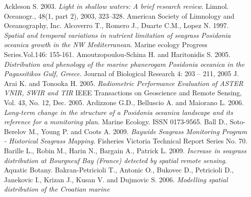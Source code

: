 \documentclass[11pt]{article}
\begin{document}
\begin{thebibliography}{999}
\label{bib}


Ackleson S.\index[people]{} 2003. \emph{Light in shallow waters: A brief research review}. Limnol. Oceanogr.,
48(1, part 2), 2003, 323–328. American Society of Limnology and Oceanography, Inc. \pageref{Ackleson, 2003}
Alcoverro T., Romero J., Duarte C.M., Lopez N. 1997. \emph{Spatial and temporal variations
in nutrient limitation of seagrass \textit{Posidonia oceanica} growth in the NW Mediterranean}.
Marine ecology Progress Series.Vol.146: 155-161. \pageref{Alcoverro1997}
Amoutzopoulou-Schina H. and Haritonidis S. 2005. \emph{Distribution and phenology of the marine phanerogam \textit{Posidonia oceanica} in the Pagassitikos Gulf, Greece}. Journal of
Biological Research 4: 203 – 211, 2005 J. \pageref{Amoutzopoulou-Schina05}
Arai K. and Tonooka H. 2005. \emph{Radiometric Performance Evaluation of \ac{ASTER} VNIR, \ac{SWIR} and \ac{TIR}} 
IEEE Transactions on Geoscience and Remote Sensing, Vol. 43, No. 12, Dec. 2005. \pageref{Arai05}
Ardizzone G.D., Belluscio A. and Maiorano L. 2006. \emph{Long-term change in the structure of
a \textit{Posidonia oceanica} landscape and its reference for a monitoring plan}. Marine Ecology.
ISSN 0173-9565. \pageref{Ardizzone06}
Ball D., Soto-Berelov M., Young P. and Coots A. 2009. \emph{Baywide Seagrass Monitoring Program - Historical Seagrass Mapping}. Fisheries Victoria Technical Report Series No. 70. \pageref{Ball09}
Barille L., Robin M., Harin N., Bargain A., Patrick L. 2009. \emph{Increase in seagrass distribution at Bourgneuf Bay (France) detected by spatial remote sensing}. Aquatic Botany. \pageref{Barille09}
Bakran-Petricioli T., Antonic O., Bukovec D., Petricioli D., Janekovic I., Krizan J., Kusan V. and Dujmovic S. 2006. \emph{Modelling spatial distribution of the Croatian marine
}
\end{thebibliography}
\end{document}
